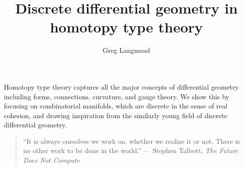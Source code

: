 \documentclass[12pt]{article}
\title{Discrete differential geometry in homotopy type theory}
\author{Greg Langmead}
\renewenvironment{abstract}{\section*{\abstractname}}{}
\begin{document}
\maketitle

\begin{abstract}
Homotopy type theory captures all the major concepts of differential geometry including forms, connections, curvature, and gauge theory. We show this by focusing on combinatorial manifolds, which are discrete in the sense of real cohesion\cite{shulman_cohesion}, and drawing inspiration from the similarly young field of discrete differential geometry.

\end{abstract}

\begin{quote} 
\centering
``It is always ourselves we work on, whether we realize it or not. There is no other work to be done in the world.'' --- Stephen Talbott, \emph{The Future Does Not Compute}\cite{talbott}
\end{quote}
\end{document}
